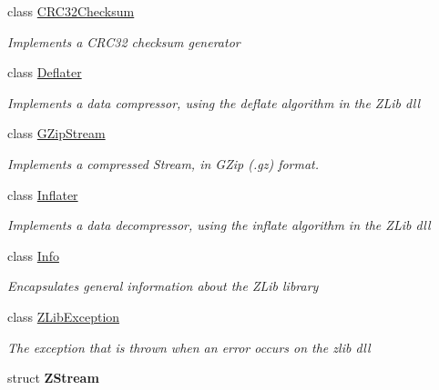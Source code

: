 \begin{DoxyCompactItemize}
class \hyperlink{class_dot_z_lib_1_1_c_r_c32_checksum}{C\+R\+C32\+Checksum}
\begin{DoxyCompactList}\small\item\em Implements a C\+R\+C32 checksum generator \end{DoxyCompactList}\item 
class \hyperlink{class_dot_z_lib_1_1_deflater}{Deflater}
\begin{DoxyCompactList}\small\item\em Implements a data compressor, using the deflate algorithm in the Z\+Lib dll \end{DoxyCompactList}\item 
class \hyperlink{class_dot_z_lib_1_1_g_zip_stream}{G\+Zip\+Stream}
\begin{DoxyCompactList}\small\item\em Implements a compressed Stream, in G\+Zip (.gz) format. \end{DoxyCompactList}\item 
class \hyperlink{class_dot_z_lib_1_1_inflater}{Inflater}
\begin{DoxyCompactList}\small\item\em Implements a data decompressor, using the inflate algorithm in the Z\+Lib dll \end{DoxyCompactList}\item 
class \hyperlink{class_dot_z_lib_1_1_info}{Info}
\begin{DoxyCompactList}\small\item\em Encapsulates general information about the Z\+Lib library \end{DoxyCompactList}\item 
class \hyperlink{class_dot_z_lib_1_1_z_lib_exception}{Z\+Lib\+Exception}
\begin{DoxyCompactList}\small\item\em The exception that is thrown when an error occurs on the zlib dll \end{DoxyCompactList}\item 
struct {\bfseries Z\+Stream}
\end{DoxyCompactItemize}
